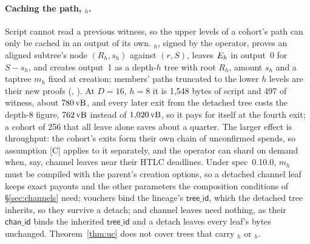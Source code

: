 \paragraph{Caching the path, $_h$.} Script cannot read a
previous witness, so the upper levels of a cohort's path can only be
cached in an output of its own. $_h$, signed by the operator,
proves an aligned subtree's node $(R_h, s_h)$ against $(r, S)$, leaves
$E_h$ in output~0 for $S - s_h$, and creates output~1 as a depth-$h$
tree with root $R_h$, amount $s_h$ and a taptree $m_h$ fixed at creation;
members' paths truncated to the lower $h$ levels are their new proofs
(, ). At $D = 16$,
$h = 8$ it is 1{,}548 bytes of script and 497 of witness, about
$780\,\mathrm{vB}$, and every later exit from the detached tree costs the depth-8
figure, $762\,\mathrm{vB}$ instead of $1{,}020\,\mathrm{vB}$, so it pays for itself at the
fourth exit; a cohort of 256 that all leave alone saves about a quarter.
The larger effect is throughput: the cohort's exits form their own chain
of unconfirmed spends, so assumption [C] applies to it separately, and the
operator can shard on demand when, say, channel leaves near their HTLC
deadlines. Under spec~0.10.0, $m_h$ must be compiled with the parent's
creation options, so a detached channel leaf keeps exact payouts and the
other parameters the composition conditions of \S\ref{sec:channels}
need; vouchers bind the lineage's $\mathsf{tree\_id}$, which the detached
tree inherits, so they survive a detach; and channel leaves need
nothing, as their $\mathsf{chan\_id}$ binds the inherited
$\mathsf{tree\_id}$ and a detach leaves every leaf's bytes unchanged. Theorem~\ref{thm:uc} does not cover
trees that carry $_h$ or $_h$.

